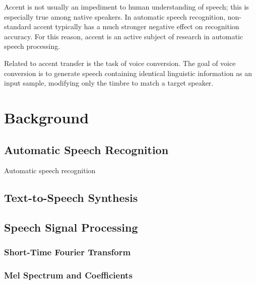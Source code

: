 \documentclass[12pt,leqno,a4paper]{article}
\begin{document}
Accent is not usually an impediment to human understanding of speech; this is especially true 
among native speakers. In automatic speech recognition, non-standard accent typically has a much 
stronger negative effect on recognition accuracy. For this reason, accent is an active subject of 
research in automatic speech processing.

Related to accent transfer is the task of voice conversion. The goal of voice conversion is to 
generate speech containing identical linguistic information as an input sample, modifying only the 
timbre to match a target speaker.

\section{Background}
\subsection{Automatic Speech Recognition}
Automatic speech recognition 
\subsection{Text-to-Speech Synthesis}

\subsection{Speech Signal Processing}
\subsubsection{Short-Time Fourier Transform}

\subsubsection{Mel Spectrum and Coefficients}
\subsubsection{}
\end{document}
